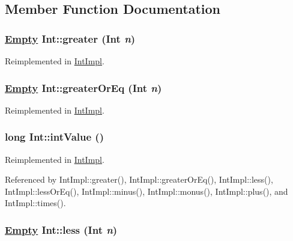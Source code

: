 \subsection{Member Function Documentation}
\hypertarget{interfaceInt_a5}{
\subsubsection[greater]{\setlength{\rightskip}{0pt plus 5cm}\hyperlink{interfaceEmpty}{Empty} Int::greater (Int {\em n})}}
\label{interfaceInt_a5}




Reimplemented in \hyperlink{classIntImpl_a5}{Int\-Impl}.\hypertarget{interfaceInt_a6}{
\subsubsection[greaterOrEq]{\setlength{\rightskip}{0pt plus 5cm}\hyperlink{interfaceEmpty}{Empty} Int::greater\-Or\-Eq (Int {\em n})}}
\label{interfaceInt_a6}




Reimplemented in \hyperlink{classIntImpl_a6}{Int\-Impl}.\hypertarget{interfaceInt_a0}{
\subsubsection[intValue]{\setlength{\rightskip}{0pt plus 5cm}long Int::int\-Value ()}}
\label{interfaceInt_a0}




Reimplemented in \hyperlink{classIntImpl_a0}{Int\-Impl}.

Referenced by Int\-Impl::greater(), Int\-Impl::greater\-Or\-Eq(), Int\-Impl::less(), Int\-Impl::less\-Or\-Eq(), Int\-Impl::minus(), Int\-Impl::monus(), Int\-Impl::plus(), and Int\-Impl::times().

\hypertarget{interfaceInt_a7}{
\subsubsection[less]{\setlength{\rightskip}{0pt plus 5cm}\hyperlink{interfaceEmpty}{Empty} Int::less (Int {\em n})}}
\label{interfaceInt_a7}




